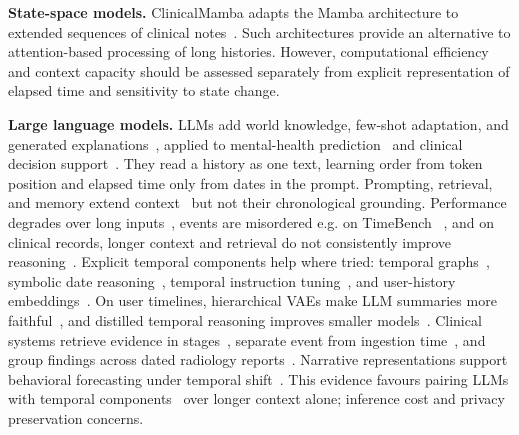 \documentclass[11pt]{article}
\theoremstyle{plain}
\theoremstyle{definition}
\theoremstyle{remark}
\begin{document}
\noindent\textbf{State-space models.}
ClinicalMamba adapts the Mamba architecture to extended
sequences of clinical notes~\citep{yang-etal-2024-clinicalmamba}.
Such architectures provide an alternative to attention-based
processing of long histories. However, computational efficiency
and context capacity should be assessed separately from
explicit representation of elapsed time and sensitivity
to state change.

\noindent\textbf{Large language models.} LLMs add world knowledge, few-shot adaptation, and generated explanations~\citep{brown2020language,touvron2023llama}, applied to mental-health prediction~\citep{xu2024mental} and clinical decision support~\citep{jin2025applications,zhu2024prompting}. They read a history as one text, learning order from token position and elapsed time only from dates in the prompt. Prompting, retrieval, and memory extend context~\citep{seegmiller2023scopeincontextlearningextraction,lewis2020retrieval,wu2020memformer} but not their chronological grounding. Performance degrades over long inputs~\citep{li2024long,liu2023lost}, events are misordered e.g. on TimeBench ~\citep{chu-etal-2024-timebench}, and on clinical records, longer context and retrieval do not consistently improve  reasoning~\citep{kruse-etal-2025-large}. Explicit temporal components help where tried: temporal graphs~\citep{xiong2024large}, symbolic date reasoning~\citep{ge-etal-2025-tremu}, temporal instruction tuning~\citep{cui2025timer}, and user-history embeddings~\citep{ning2025user}. On user timelines, hierarchical VAEs make LLM summaries more faithful~\citep{song-etal-2024-combining}, and distilled temporal reasoning improves smaller models~\citep{song-etal-2025-temporal}. Clinical systems retrieve evidence in stages~\citep{agarwal-etal-2026-deterministic}, separate event from ingestion time~\citep{zhao-etal-2026-beyond-retrieval}, and group findings across dated radiology reports~\citep{zhou-etal-2026-radtimeline}. Narrative representations support behavioral forecasting under temporal shift~\citep{hayat-etal-2025-context}. This evidence favours pairing LLMs with temporal components~\citep{song-etal-2024-combining,wang-etal-2025-posts,cui2025timer} over longer context alone; inference cost and privacy preservation concerns.
\end{document}
